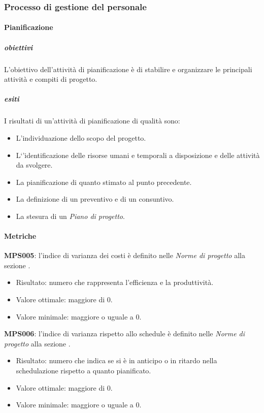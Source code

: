 \documentclass[../piano-di-qualifica.tex]{subfiles}
\begin{document}
\subsubsection{Processo di gestione del personale}%
\label{subs:processo_di_gestione_del_personale}

\paragraph{Pianificazione}%
\label{par:pianificazione}

\subparagraph{obiettivi}%
\label{subp:obiettivi}
L'obiettivo dell'attività di pianificazione è di stabilire e organizzare le principali attività e compiti di progetto.

\subparagraph{esiti}%
\label{subp:esiti}
I risultati di un'attività di pianificazione di qualità sono:
\begin{itemize}
	\item L'individuazione dello scopo del progetto.
	\item L`'identificazione delle risorse umani e temporali a disposizione e delle attività da svolgere.
	\item La pianificazione di quanto stimato al punto precedente.
	\item La definizione di un preventivo e di un consuntivo.
	\item La stesura di un \textit{Piano di progetto}.
\end{itemize}

\paragraph{Metriche}
\label{par:metriche}

\textbf{MPS005}: l'indice di varianza dei costi è definito nelle \textit{Norme di progetto} alla sezione .
\begin{itemize}
	\item Risultato: numero che rappresenta l'efficienza e la produttività.
	\item Valore ottimale: maggiore di 0.
	\item Valore minimale: maggiore o uguale a 0.
\end{itemize}

\textbf{MPS006}: l'indice di varianza rispetto allo schedule è definito nelle \textit{Norme di progetto} alla sezione .
\begin{itemize}
	\item Risultato: numero che indica se si è in anticipo o in ritardo nella schedulazione rispetto a quanto pianificato.
	\item Valore ottimale: maggiore di 0.
	\item Valore minimale: maggiore o uguale a 0.
\end{itemize}
\end{document}
